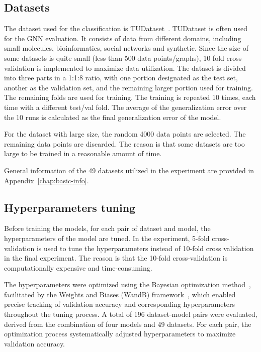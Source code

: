 \subsection{Datasets}\label{sec:datasets}
The dataset used for the classification is TUDataset~\cite{morris2020tudataset}. TUDataset is often used for the GNN evaluation. It consists of data from different domains, including small molecules, bioinformatics, social networks and synthetic. Since the size of some datasets is quite small (less than 500 data points/graphs), 10-fold cross-validation is implemented to maximize data utilization.  The dataset is divided into three parts in a 1:1:8 ratio, with one portion designated as the test set, another as the validation set, and the remaining larger portion used for training. The remaining folds are used for training. The training is repeated 10 times, each time with a different test/val fold. The average of the generalization error over the 10 runs is calculated as the final generalization error of the model.

For the dataset with large size, the random 4000 data points are selected. The remaining data points are discarded. The reason is that some datasets are too large to be trained in a reasonable amount of time.

General information of the 49 datasets utilized in the experiment are provided in Appendix~\ref{chap:basic-info}.

\subsection{Hyperparameters tuning}\label{sec:hyperparameters tuning}
Before training the models, for each pair of dataset and model, the hyperparameters of the model are tuned. In the experiment, 5-fold cross-validation is used to tune the hyperparameters instead of 10-fold cross validation in the final experiment. The reason is that the 10-fold cross-validation is computationally expensive and time-consuming. 

The hyperparameters were optimized using the Bayesian optimization method~\cite{frazier2018tutorial}, facilitated by the Weights and Biases (WandB) framework~\cite{wandb}, which enabled precise tracking of validation accuracy and corresponding hyperparameters throughout the tuning process. A total of 196 dataset-model pairs were evaluated, derived from the combination of four models and 49 datasets. For each pair, the optimization process systematically adjusted hyperparameters to maximize validation accuracy.

